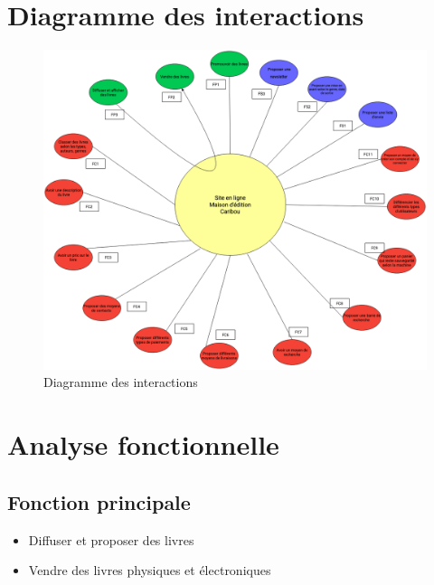\documentclass[a4paper, 13pt]{article}
\begin{document}
\section{Diagramme des interactions}
\begin{figure}[h!]
    \centering
    \includegraphics[width=0.8\linewidth]{images/diag_pieuvre.png}
    \caption{Diagramme des interactions\label{fig:Figure2}}
\end{figure}

\section{Analyse fonctionnelle}
\subsection{Fonction principale}
\begin{itemize}
    \item Diffuser et proposer des livres
    \item Vendre des livres physiques et électroniques
\end{itemize}
\end{document}
